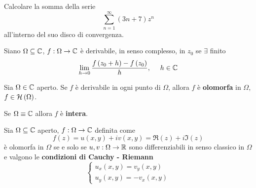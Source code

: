 Calcolare la somma della serie
\begin{equation*}
\sum\limits ^{\infty }_{n = 1}\left(3n + 7\right) z^{n}
\end{equation*}
all'interno del suo disco di convergenza.
\ParteSoluzioni
\Soluzione
\begin{defn}
Siano $\Omega \subseteq \mathbb{C} $, $f:\Omega \rightarrow \mathbb{C} $ è derivabile, in senso complesso, in $z_{0}$ se $\exists $ finito
\begin{equation*}
\lim\limits _{h\rightarrow 0}\frac{f\left(z_{0} + h\right) - f\left(z_{0}\right)}{h} ,\ \ \ \ h\in \mathbb{C} 
\end{equation*}
\end{defn}
\begin{defn}
Sia $\Omega \in \mathbb{C} $ aperto. Se $f$ è derivabile in ogni punto di $\Omega $, allora $f$ è \textbf{olomorfa} in $\Omega $, $f\in \mathcal{H} \left(\Omega \right)$.
\end{defn}
\begin{rem}
Se $\Omega \equiv \mathbb{C} $ allora $f$ è \textbf{intera}.
\end{rem}
\begin{thm}
 Sia $\Omega \subseteq \mathbb{C} $ aperto, $f:\Omega \rightarrow \mathbb{C} $ definita come
\begin{equation*}
f\left(z\right) = u\left(x,y\right) + iv\left(x,y\right) = \Re \left(z\right) + i\Im \left(z\right)
\end{equation*}
è olomorfa in $\Omega $ se e solo se $u,v:\Omega \rightarrow \mathbb{R} $ sono differenziabili in senso classico in $\Omega $ e valgono le \textbf{condizioni di Cauchy - Riemann}
\begin{equation}
\begin{cases}
u_{x}\left(x,y\right) = v_{y}\left(x,y\right)\\
u_{y}\left(x,y\right) = - v_{x}\left(x,y\right)
\end{cases}
\end{equation}
\end{thm}
